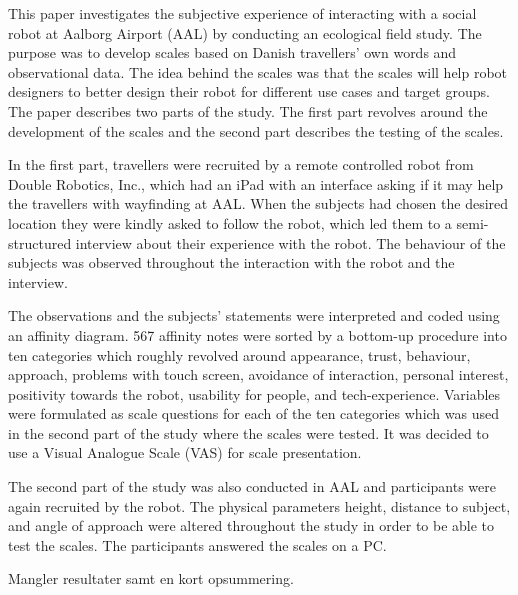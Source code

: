 \label{Abstract}
This paper investigates the subjective experience of interacting with a social robot at Aalborg Airport (AAL) by conducting an ecological field study. The purpose was to develop scales based on Danish travellers' own words and observational data. The idea behind the scales was that the scales will help robot designers to better design their robot for different use cases and target groups. The paper describes two parts of the study. The first part revolves around the development of the scales and the second part describes the testing of the scales.

In the first part, travellers were recruited by a remote controlled robot from Double Robotics, Inc., which had an iPad with an interface asking if it may help the travellers with wayfinding at AAL. When the subjects had chosen the desired location they were kindly asked to follow the robot, which led them to a semi-structured interview about their experience with the robot. The behaviour of the subjects was observed throughout the interaction with the robot and the interview. 

The observations and the subjects' statements were interpreted and coded using an affinity diagram. 567 affinity notes were sorted by a bottom-up procedure into ten categories which roughly revolved around appearance, trust, behaviour, approach, problems with touch screen, avoidance of interaction, personal interest, positivity towards the robot, usability for people, and tech-experience.  Variables were formulated as scale questions for each of the ten categories which was used in the second part of the study where the scales were tested. It was decided to use a Visual Analogue Scale (VAS) for scale presentation.

The second part of the study was also conducted in AAL and participants were again recruited by the robot. The physical parameters height, distance to subject, and angle of approach were altered throughout the study in order to be able to test the scales. The participants answered the scales on a PC. 

{\color{red} Mangler resultater samt en kort opsummering.}

